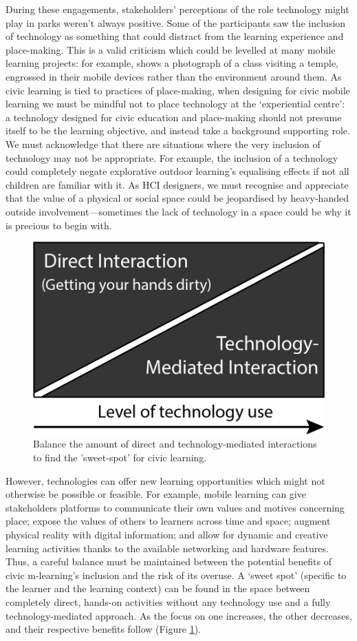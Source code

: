 During these engagements, stakeholders’ perceptions of the role technology might play in parks weren't always positive. Some of the participants saw the inclusion of technology as something that could distract from the learning experience and place-making. This is a valid criticism which could be levelled at many mobile learning projects: for example, \citep{Shih2010} shows a photograph of a class visiting a temple, engrossed in their mobile devices rather than the environment around them. As civic learning is tied to practices of place-making, when designing for civic mobile learning we must be mindful not to place technology at the `experiential centre': a technology designed for civic education and place-making should not presume itself to be the learning objective, and instead take a background supporting role. We must acknowledge that there are situations where the very inclusion of technology may not be appropriate. For example, the inclusion of a technology could completely negate explorative outdoor learning’s equalising effects if not all children are familiar with it. As HCI designers, we must recognise and appreciate that the value of a physical or social space could be jeopardised by heavy-handed outside involvement—sometimes the lack of technology in a space could be why it is precious to begin with.

\begin{figure}
  \centering
  \includegraphics[width=0.45\columnwidth]{images/chapter04/techBalance.png}
  \caption[Balancing technology use]{Balance the amount of direct and technology-mediated interactions to find the 'sweet-spot' for civic learning.}
  \label{fig:techBalance}
\end{figure}

However, technologies can offer new learning opportunities which might not otherwise be possible or feasible. For example, mobile learning can give stakeholders platforms to communicate their own values and motives concerning place; expose the values of others to learners across time and space; augment physical reality with digital information; and allow for dynamic and creative learning activities thanks to the available networking and hardware features. Thus, a careful balance must be maintained between the potential benefits of civic m-learning’s inclusion and the risk of its overuse. A `sweet spot' (specific to the learner and the learning context) can be found in the space between completely direct, hands-on activities without any technology use and a fully technology-mediated approach. As the focus on one increases, the other decreases, and their respective benefits follow (Figure \ref{fig:techBalance}). 

